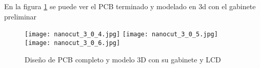    En la figura \ref{fig:nanocut_3_0_2} se puede ver el PCB terminado y modelado en 3d con el gabinete preliminar
  \begin{figure}
      \begin{center}
         \texttt{[image: nanocut\_3\_0\_4.jpg]}
         \texttt{[image: nanocut\_3\_0\_5.jpg]}
         \texttt{[image: nanocut\_3\_0\_6.jpg]}
      \end{center}
      \caption{Diseño de PCB completo y modelo 3D con su gabinete y LCD}
      \label{fig:nanocut_3_0_2}
   \end{figure}


